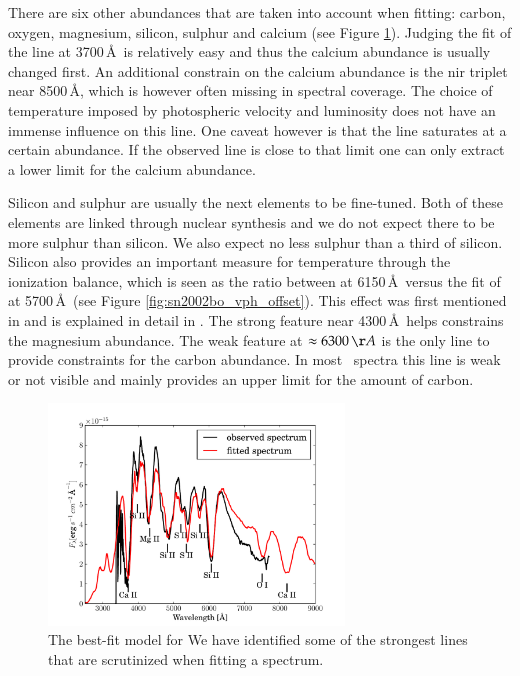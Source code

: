 There are six other abundances that are taken into account when fitting: carbon, oxygen, magnesium, silicon, sulphur and calcium (see Figure \ref{fig:sn2002bo_lineident}). Judging the fit of the  line at 3700\,\AA\ is relatively easy and thus the calcium abundance is usually changed first. An additional constrain on the calcium abundance is the \gls{nir} triplet near 8500\,\AA, which is however often missing in spectral coverage. The choice of temperature imposed by photospheric velocity and luminosity does not have an immense influence on this line. One caveat however is that the  line saturates at a certain abundance. If the observed  line is close to that limit one can only extract a lower limit for the calcium abundance.

Silicon and sulphur are usually the next elements to be fine-tuned. Both of these elements are linked through nuclear synthesis and we do not expect there to be more sulphur than silicon. We also expect no less sulphur than a third of silicon. Silicon also provides an important measure for temperature through the ionization balance, which is seen as the ratio between  at 6150\,\AA\ versus the fit of  at 5700\,\AA\ (see Figure \ref{fig:sn2002bo_vph_offset}). This effect was first mentioned in \cite{1995ApJ...455L.147N} and is explained in detail in \citep{2008MNRAS.389.1087H}. The strong  feature near 4300\,\AA\ helps constrains the magnesium abundance. The weak  feature at $\approx 6300\,\AA$ is the only line to provide constraints for the carbon abundance. In most \sneia\ spectra this line is weak or not visible and mainly provides an upper limit for the amount of carbon.

\begin{figure}[tb] %
   \centering
   \includegraphics[width=0.7\textwidth]{chapter_dalek/plots/bf2002bo-10_lineid.pdf} 
   \caption[Best-Fit of SN 2002bo with MLMC including line identification]{The best-fit model for  We have identified some of the strongest lines that are scrutinized when fitting a  spectrum.}
   \label{fig:sn2002bo_lineident}
\end{figure}

